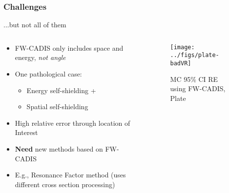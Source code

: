 \documentclass[xcolor=x11names,compress]{beamer}
\renewcommand{\(}{\begin{columns}}
\renewcommand{\)}{\end{columns}}
\newcommand{\<}[1]{\begin{column}{#1}}
\renewcommand{\>}{\end{column}}
\begin{document}
\begin{frame}[fragile]
  \frametitle{Challenges}

	...but not all of them
	\begin{columns}
  	\begin{column}{0.5\textwidth}
  	\begin{center}
		\begin{itemize}
		\item FW-CADIS only includes space and energy, 
			\textit{not angle}
		\item One pathological case:
		\begin{itemize}
		\item Energy self-shielding +
		\item Spatial self-shielding
		\end{itemize}
		\item High relative error through location of Interest
		\item \textbf{Need} new methods based on FW-CADIS
		\item E.g., Resonance Factor method (uses different cross section processing)
		\end{itemize}
	\end{center}
  	\end{column}
 	\begin{column}{0.5\textwidth}
  	\begin{center}
  	\begin{figure}
  		\texttt{[image: ../figs/plate-badVR]}
  		\caption{MC 95\% CI RE using FW-CADIS, Plate}
  	\end{figure}
  	\end{center}
  	\end{column}
	\end{columns}
  
\end{frame}


\end{document}
